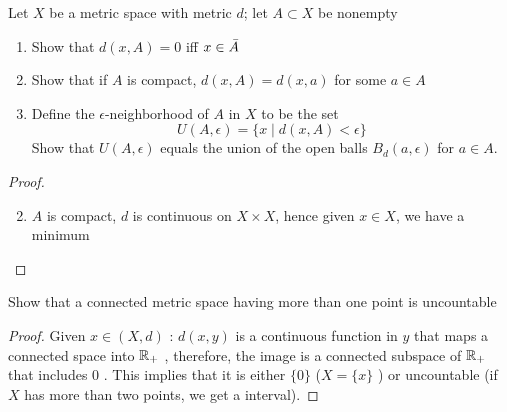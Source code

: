 \documentclass[11pt]{article}
\begin{document}
\begin{exercise}
\label{ex27.2}
Let \(X\) be a metric space with metric \(d\); let \(A\subset X\) be nonempty
\begin{enumerate}
\item Show that \(d(x,A)=0\) iff \(x\in\bar{A}\)
\item Show that if \(A\) is compact, \(d(x,A)=d(x,a)\) for some \(a\in A\)
\item Define the \(\epsilon\)-neighborhood of \(A\) in \(X\) to be the set
\begin{equation*}
U(A,\epsilon)=\{x\mid d(x,A)<\epsilon\}
\end{equation*}
Show that \(U(A,\epsilon)\) equals the union of the open balls \(B_d(a,\epsilon)\) for \(a\in A\).
\end{enumerate}
\end{exercise}

\begin{proof}
\begin{enumerate}
\setcounter{enumi}{1}
\item \(A\) is compact, \(d\) is continuous on \(X\times X\), hence given \(x\in X\), we have a minimum
\end{enumerate}
\end{proof}

\begin{exercise}
\label{ex27.4}
Show that a connected metric space having more than one point is uncountable
\end{exercise}

\begin{proof}
Given \(x∈(X,d)\) : \(d(x,y)\) is a continuous function in \(y\) that maps a connected space
into \(\mathbb{R}_+\) , therefore, the image is a connected subspace of \(\mathbb{R}_+\) that includes 0 . This
implies that it is either \(\{0\}\) (\(X=\{x\}\) ) or uncountable (if \(X\) has more than two points,
we get a interval).
\end{proof}
\end{document}
